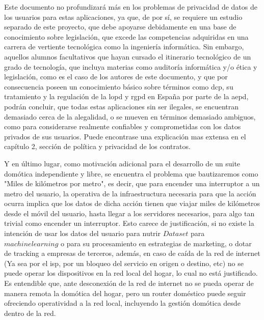 \vspace{1cm}

Este documento no profundizará más en los problemas de privacidad de datos de los usuarios para estas aplicaciones, ya que, de por sí, se requiere un estudio separado de este proyecto, que debe apoyarse debidamente en una base de conocimiento sobre legislación, que excede las competencias adquiridas en una carrera de vertiente tecnológica como la ingeniería informática. Sin embargo, aquellos alumnos facultativos que hayan cursado el itinerario tecnológico de un grado de tecnología, que incluya materias como auditoría informática y/o ética y legislación, como es el caso de los autores de este documento, y que por consecuencia poseen un conocimiento básico sobre términos como \gls{dcp}, su tratamiento y la regulación de la \gls{lopd} y \gls{rgpd} en España por parte de la \gls{aepd}, podrán concluir, que todas estas aplicaciones sin ser ilegales, se encuentran demasiado cerca de la alegalidad, o se mueven en términos demasiado ambiguos, como para considerarse realmente confiables y comprometidas con los datos privados de sus usuarios. Puede encontrase una explicación mas extensa en el capítulo 2, sección de política y privacidad de los contratos.

\vspace{1cm}

Y en último lugar, como motivación adicional para el desarrollo de un suite domótica independiente y libre, se encuentra el problema que bautizaremos como "Miles de kilómetros por metro", es decir, que para encender una interruptor a un metro del usuario, la operativa de la infraestructura necesaria para que la acción ocurra implica que los datos de dicha acción tienen que viajar miles de kilómetros desde el móvil del usuario, hasta llegar a los servidores necesarios, para algo tan trivial como encender un interruptor. Esto carece de justificación, si no existe la intención de usar los datos del usuario para nutrir $Dataset$ para $machine learning$ o para su procesamiento en estrategias de marketing, o dotar de tracking a empresas de terceros, además, en caso de caída de la red de internet (Ya sea por el \gls{isp}, por un bloqueo del servicio en origen o destino, etc) no se puede operar los dispositivos en la red local del hogar, lo cual no está justificado. Es entendible que, ante desconexión de la red de internet no se pueda operar de manera remota la domótica del hogar, pero un router doméstico puede seguir ofreciendo operatividad a la red local, incluyendo la gestión domótica desde dentro de la red.

